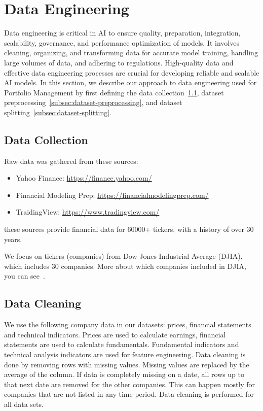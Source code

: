 \documentclass[../xlapes02]{subfiles}
\begin{document}
    \section{Data Engineering}\label{sec:data-engineering}
    Data engineering is critical in AI to ensure quality, preparation, integration, scalability, governance, and performance optimization of models. It involves cleaning, organizing, and transforming data for accurate model training, handling large volumes of data, and adhering to regulations. High-quality data and effective data engineering processes are crucial for developing reliable and scalable AI models. In this section, we describe our approach to data engineering used for Portfolio Management by first defining the data collection~\cref{subsec:data-collection}, dataset preprocessing~\cref{subsec:dataset-preprocessing}, and dataset splitting~\cref{subsec:dataset-splitting}.

    \subsection{Data Collection}\label{subsec:data-collection}
    Raw data was gathered from these sources:
    \begin{itemize}
        \item Yahoo Finance: \url{https://finance.yahoo.com/}
        \item Financial Modeling Prep: \url{https://financialmodelingprep.com/}
        \item TraidingView: \url{https://www.tradingview.com/}
    \end{itemize}
    these sources provide financial data for 60000+ tickers, with a history of over 30 years.

    We focus on tickers (companies) from Dow Jones Industrial Average (DJIA), which includes 30 companies. More about which companies included in DJIA, you can see~\cite{enwiki:1141766585}.

    \subsection{Data Cleaning}\label{subsubsec:data-cleaning}
    We use the following company data in our datasets: prices, financial statements and technical indicators. Prices are used to calculate earnings, financial statements are used to calculate fundamentals. Fundamental indicators and technical analysis indicators are used for feature engineering. Data cleaning is done by removing rows with missing values. Missing values are replaced by the average of the column. If data is completely missing on a date, all rows up to that next date are removed for the other companies. This can happen mostly for companies that are not listed in any time period. Data cleaning is performed for all data sets.
\end{document}
